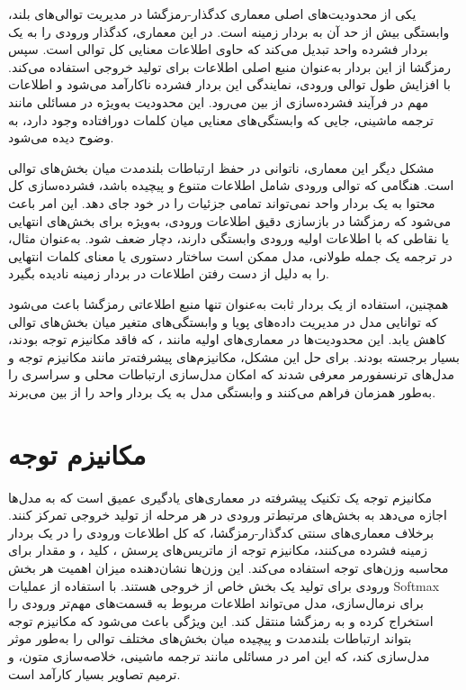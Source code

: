 یکی از محدودیت‌های اصلی معماری کدگذار-رمزگشا  در مدیریت توالی‌های بلند، وابستگی بیش از حد آن به بردار زمینه  است. در این معماری، کدگذار ورودی را به یک بردار فشرده واحد تبدیل می‌کند که حاوی اطلاعات معنایی کل توالی است. سپس رمزگشا از این بردار به‌عنوان منبع اصلی اطلاعات برای تولید خروجی استفاده می‌کند. با افزایش طول توالی ورودی، نمایندگی این بردار فشرده ناکارآمد می‌شود و اطلاعات مهم در فرآیند فشرده‌سازی از بین می‌رود. این محدودیت به‌ویژه در مسائلی مانند ترجمه ماشینی، جایی که وابستگی‌های معنایی میان کلمات دورافتاده وجود دارد، به وضوح دیده می‌شود.

مشکل دیگر این معماری، ناتوانی در حفظ ارتباطات بلندمدت میان بخش‌های توالی است. هنگامی که توالی ورودی شامل اطلاعات متنوع و پیچیده باشد، فشرده‌سازی کل محتوا به یک بردار واحد نمی‌تواند تمامی جزئیات را در خود جای دهد. این امر باعث می‌شود که رمزگشا در بازسازی دقیق اطلاعات ورودی، به‌ویژه برای بخش‌های انتهایی یا نقاطی که با اطلاعات اولیه ورودی وابستگی دارند، دچار ضعف شود. به‌عنوان مثال، در ترجمه یک جمله طولانی، مدل ممکن است ساختار دستوری یا معنای کلمات انتهایی را به دلیل از دست رفتن اطلاعات در بردار زمینه نادیده بگیرد.

همچنین، استفاده از یک بردار ثابت به‌عنوان تنها منبع اطلاعاتی رمزگشا باعث می‌شود که توانایی مدل در مدیریت داده‌های پویا و وابستگی‌های متغیر میان بخش‌های توالی کاهش یابد. این محدودیت‌ها در معماری‌های اولیه مانند ، که فاقد مکانیزم توجه بودند، بسیار برجسته بودند. برای حل این مشکل، مکانیزم‌های پیشرفته‌تر مانند مکانیزم توجه و مدل‌های ترنسفورمر معرفی شدند که امکان مدل‌سازی ارتباطات محلی و سراسری را به‌طور همزمان فراهم می‌کنند و وابستگی مدل به یک بردار واحد را از بین می‌برند.

\section{مکانیزم توجه\protect{}}
مکانیزم توجه \cite{bahdanauNeuralMachineTranslation2016} یک تکنیک پیشرفته در معماری‌های یادگیری عمیق است که به مدل‌ها اجازه می‌دهد به بخش‌های مرتبط‌تر ورودی در هر مرحله از تولید خروجی تمرکز کنند. برخلاف معماری‌های سنتی کدگذار-رمزگشا، که کل اطلاعات ورودی را در یک بردار زمینه فشرده می‌کنند، مکانیزم توجه از ماتریس‌های پرسش 
،
 کلید 
 ،
  و مقدار   برای محاسبه وزن‌های توجه استفاده می‌کند. این وزن‌ها نشان‌دهنده میزان اهمیت هر بخش ورودی برای تولید یک بخش خاص از خروجی هستند. با استفاده از عملیات Softmax برای نرمال‌سازی، مدل می‌تواند اطلاعات مربوط به قسمت‌های مهم‌تر ورودی را استخراج کرده و به رمزگشا منتقل کند. این ویژگی باعث می‌شود که مکانیزم توجه بتواند ارتباطات بلندمدت و پیچیده میان بخش‌های مختلف توالی را به‌طور موثر مدل‌سازی کند، که این امر در مسائلی مانند ترجمه ماشینی، خلاصه‌سازی متون، و ترمیم تصاویر بسیار کارآمد است.
  
